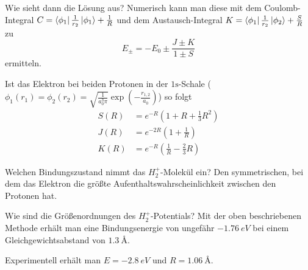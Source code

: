 \begin{fquestion}{Wie sieht dann die Lösung aus?}
    Numerisch kann man diese mit dem Coulomb-Integral $C = \bra{\phi_1} \frac{1}{r_2} \ket{\phi_1} + \frac{1}{R}$ und dem Austausch-Integral $K = \bra{\phi_1} \frac{1}{r_2} \ket{\phi_2} + \frac{S}{R}$ zu
    $$E_\pm = -E_0 \pm \frac{J \pm K}{1 \pm S}$$
    ermitteln.
    
    Ist das Elektron bei beiden Protonen in der $1\mathrm{s}$-Schale ($\phi_1(r_1) = \phi_2(r_2) = \sqrt{\frac{1}{a_0^3 \pi}} \exp\left(-\frac{r_{1,2}}{a_0}\right)$) so folgt
    $$\begin{aligned}
        S(R) &= e^{-R} \left(1 + R + \frac{1}{3} R^2\right) \\
        J(R) &= e^{-2R} \left(1 + \frac{1}{R}\right) \\
        K(R) &= e^{-R} \left(\frac{1}{R} - \frac{2}{3} R \right)
    \end{aligned} $$
    
    \begin{center}
    \end{center}
\end{fquestion}

\begin{fquestion}{Welchen Bindungszustand nimmt das $H_2^+$-Molekül ein?}
    Den symmetrischen, bei dem das  Elektron die größte Aufenthaltswahrscheinlichkeit zwischen den Protonen hat.
\end{fquestion}

\begin{fquestion}{Wie sind die Größenordnungen des $H_2^+$-Potentials?}
    Mit der oben beschriebenen Methode erhält man eine Bindungsenergie von ungefähr $\SI{-1.76}{eV}$ bei einem Gleichgewichtsabstand von $\SI{1.3}{\angstrom}$.
    
    Experimentell erhält man $E = \SI{-2.8}{eV}$ und $R = \SI{1.06}{\angstrom}$.
\end{fquestion}

